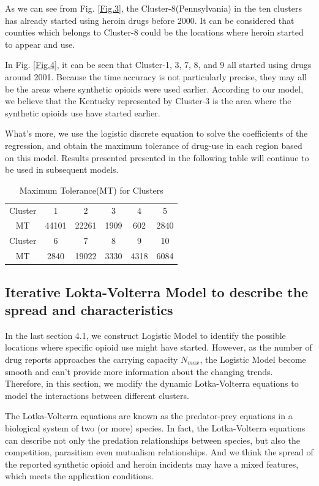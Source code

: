 \documentclass[12pt]{article}
\begin{document}
As we can see from Fig. \ref{Fig.3}, the Cluster-8(Pennsylvania) in the ten clusters has already started using heroin drugs before 2000. It can be considered that counties which belongs to Cluster-8 could be the locations where heroin started to appear and use.

In Fig. \ref{Fig.4}, it can be seen that Cluster-1, 3, 7, 8, and 9 all started using drugs around 2001. Because the time accuracy is not particularly precise, they may all be the areas where synthetic opioids were used earlier. According to our model, we believe that the Kentucky represented by Cluster-3 is the area where the synthetic opioids use have started earlier.

What’s more, we use the logistic discrete equation to solve the coefficients of the regression, and obtain the maximum tolerance of drug-use in each region based on this model. Results presented presented in the following table will continue to be used in subsequent models.
\begin{table}[H]
	\centering
	\caption{Maximum Tolerance(MT) for Clusters}
	\begin{tabular}
	{cccccc}
	\toprule[1pt]
	Cluster	& 1 & 2 & 3 & 4 &5 \\
	MT	& 44101 & 22261 & 1909 & 602 & 2840\\
	\midrule
	Cluster	& 6 & 7 &  8 & 9 & 10 \\
	MT & 2840 & 19022 & 3330 & 4318 & 6084\\
	\bottomrule[1pt]
	\end{tabular}
\end{table}

\subsection{Iterative Lokta-Volterra Model to describe the spread and characteristics}
In the last section 4.1, we construct Logistic Model to identify the possible locations where specific opioid use might have started. However, as the number of drug reports approaches the carrying capacity $N_{max}$, the Logistic Model become smooth and can’t provide more information about the changing trends. Therefore, in this section, we modify the dynamic Lotka-Volterra equations to model the interactions between different clusters.
	
The Lotka-Volterra equations are known as the predator-prey equations in a biological system of two (or more) species. In fact, the Lotka-Volterra equations can describe not only the predation relationships between species, but also the competition, parasitism even mutualism relationships. And we think the spread of the reported synthetic opioid and heroin incidents may have a mixed features, which meets the application conditions.
\end{document}
